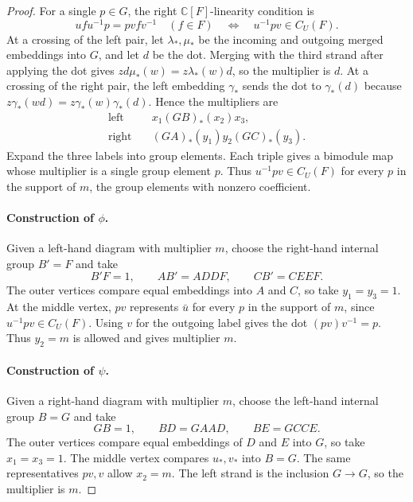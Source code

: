 \documentclass[11pt,a4paper]{article}
\numberwithin{equation}{section}
\theoremstyle{definition}
\newcommand{\C}{\mathbb C}
\begin{document}
\begin{proof}
For a single
\(p\in G\), the right \(\C[F]\)-linearity condition is
\[
 u f u^{-1}p=p v f v^{-1}\quad(f\in F)
 \quad\Longleftrightarrow\quad u^{-1}pv\in C_U(F).
\]
At a crossing of the left pair, let \(\lambda_*,\mu_*\) be the
incoming and outgoing merged embeddings into \(G\), and let \(d\)
be the dot. Merging with the third strand after applying the dot
gives \(zd\mu_*(w)=z\lambda_*(w)d\), so the multiplier is \(d\).
At a crossing of the right pair, the left embedding \(\gamma_*\)
sends the dot to \(\gamma_*(d)\) because
\(z\gamma_*(wd)=z\gamma_*(w)\gamma_*(d)\). Hence the multipliers are
\[
 \begin{aligned}
 \text{left}\quad &x_1(\boxed{GB})_*(x_2)x_3,\\
 \text{right}\quad &(\boxed{GA})_*(y_1)y_2(\boxed{GC})_*(y_3).
 \end{aligned}
\]
Expand the three labels into group elements. Each triple gives a
bimodule map whose multiplier is a single group element \(p\).
Thus \(u^{-1}pv\in C_U(F)\) for every \(p\) in the support of \(m\),
the group elements with nonzero coefficient.

\paragraph{Construction of \(\phi\).}
Given a left-hand diagram with multiplier \(m\), choose the right-hand
internal group \(B'=F\) and take
\[
 \boxed{B'F}=1,\qquad
 \boxed{AB'}=\boxed{AD}\boxed{DF},\qquad
 \boxed{CB'}=\boxed{CE}\boxed{EF}.
\]
The outer vertices compare equal embeddings into \(A\) and \(C\),
so take \(y_1=y_3=1\). At the middle vertex, \(pv\) represents
\(\bar u\) for every \(p\) in the support of \(m\), since \(u^{-1}pv\in C_U(F)\).
Using \(v\) for the outgoing label gives the dot
\((pv)v^{-1}=p\). Thus \(y_2=m\) is allowed and gives multiplier \(m\).

\paragraph{Construction of \(\psi\).}
Given a right-hand diagram with multiplier \(m\), choose the left-hand
internal group \(B=G\) and take
\[
 \boxed{GB}=1,\qquad
 \boxed{BD}=\boxed{GA}\boxed{AD},\qquad
 \boxed{BE}=\boxed{GC}\boxed{CE}.
\]
The outer vertices compare equal embeddings of \(D\) and \(E\)
into \(G\), so take \(x_1=x_3=1\). The middle vertex compares
\(u_*,v_*\) into \(B=G\). The same representatives \(pv,v\)
allow \(x_2=m\). The left strand is the inclusion \(G\to G\),
so the multiplier is \(m\).


\end{proof}
\end{document}
